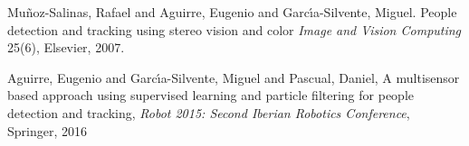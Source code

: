\documentclass{svproc}
\begin{document}















%
\begin{thebibliography}{6}
%

Mu{\~n}oz-Salinas, Rafael and Aguirre, Eugenio and Garc{\'\i}a-Silvente, Miguel.
People detection and tracking using stereo vision and color
\textit{Image and Vision Computing} 25(6), Elsevier, 2007.


Aguirre, Eugenio and Garc{\'\i}a-Silvente, Miguel and Pascual, Daniel,
A multisensor based approach using supervised learning and particle filtering for people detection and tracking,
\textit{Robot 2015: Second Iberian Robotics Conference}, Springer, 2016


\end{thebibliography}
\end{document}
